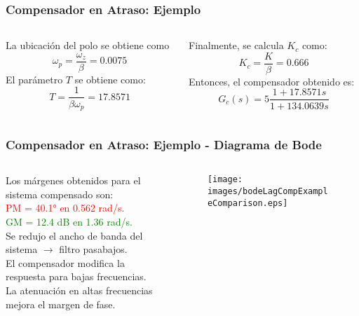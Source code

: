 \documentclass[aspectratio=169, handout]{beamer}
\theoremstyle{definition}
\theoremstyle{plain}
\theoremstyle{remark}
\begin{document}
\begin{frame}[<+->]\frametitle{Compensador en Atraso: Ejemplo}
	\begin{columns}
	\begin{column}{0.5\textwidth}
		La ubicación del polo se obtiene como
		\begin{equation*}
			\omega_p = \frac{\omega_z}{\beta} = 0.0075
		\end{equation*}
		El parámetro $T$ se obtiene como:
		\begin{equation*}
			T = \frac{1}{\beta \omega_p} = 17.8571
		\end{equation*}
	\end{column}	
	\begin{column}{0.5\textwidth}
		Finalmente, se calcula $K_c$ como:
		\begin{equation*}
			K_c = \frac{K}{\beta} = 0.666
		\end{equation*}
		Entonces, el compensador obtenido es:
		\begin{equation*}
			G_c(s) = 5 \frac{1+17.8571s}{1+134.0639s}
		\end{equation*}
	\end{column}	
	\end{columns}
\end{frame}


\begin{frame}[<+->]\frametitle{Compensador en Atraso: Ejemplo - Diagrama de Bode}
\begin{columns}
	\begin{column}{0.35\textwidth}
		\small
		Los márgenes obtenidos para el sistema compensado son:\\
		\vspace*{2mm}
		\pause
		\textcolor{red}{PM = \ang{40.1} en 0.562 rad/s.}\\
		\vspace*{2mm}
		\pause
		\textcolor{green}{GM = 12.4 dB en 1.36 rad/s.}\\
		\vspace*{2mm}
		\pause
		Se redujo el ancho de banda del sistema $\rightarrow$ filtro pasabajos.\\
		\vspace*{2mm}
		\pause
		El compensador modifica la respuesta para bajas frecuencias.\\
		\vspace*{2mm}
		\pause
		La atenuación en altas frecuencias mejora el margen de fase.
	\end{column}
	\begin{column}{0.65\textwidth}
		\begin{figure}
			\centering
			\texttt{[image: images/bodeLagCompExampleComparison.eps]}
		\end{figure}
	\end{column}
\end{columns}
\end{frame}
\end{document}
